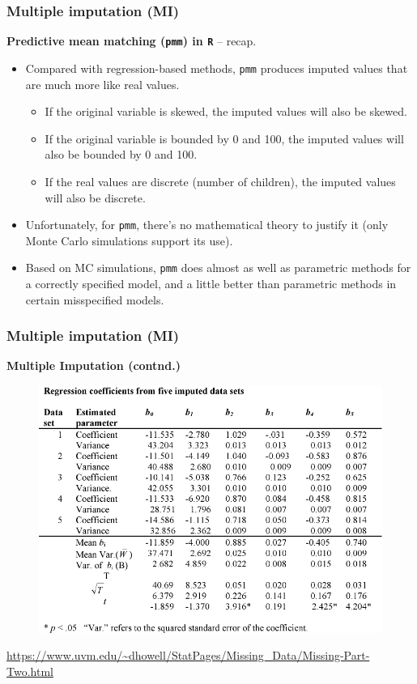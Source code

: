 \documentclass{beamer}
\begin{document}
\begin{frame}
\frametitle{Multiple imputation (MI)}
\textbf{Predictive mean matching (\texttt{pmm}) in \texttt{R}} -- recap.\\
\bigskip
\begin{itemize}
    \item Compared with regression-based methods, \texttt{pmm} produces imputed values that are much more like real values. 
    \begin{itemize}
        \item If the original variable is skewed, the imputed values will also be skewed.
        \item If the original variable is bounded by 0 and 100, the imputed values will also be bounded by 0 and 100.
        \item If the real values are discrete (number of children), the imputed values will also be discrete. 
    \end{itemize} 
    \smallskip
    \item Unfortunately, for \texttt{pmm}, there’s no mathematical theory to justify it (only Monte Carlo simulations support its use).
    \smallskip
    \item Based on MC simulations,  \texttt{pmm} does almost as well as parametric methods for a correctly specified model, and a little better than parametric methods in certain misspecified models.
\end{itemize}
\end{frame}
\begin{frame}
\frametitle{Multiple imputation (MI)}
\textbf{Multiple Imputation (contnd.) }
\begin{figure}
\includegraphics[width=0.7\linewidth]{IMG/mitable.jpg}
\end{figure}
\scriptsize{\url{https://www.uvm.edu/~dhowell/StatPages/Missing_Data/Missing-Part-Two.html}}
\end{frame}
\end{document}
